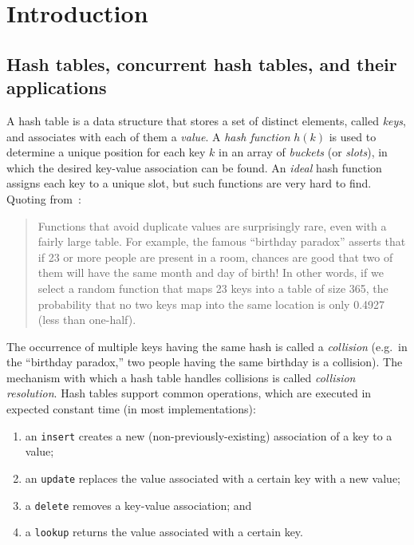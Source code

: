 \chapter{Introduction}\label{ch:introduction}


\section{Hash tables, concurrent hash tables, and their applications}\label{sec:hash-tables}

A hash table is a data structure that stores a set of distinct elements, called \emph{keys}, and associates with each of them a \emph{value}.
A \emph{{hash function}} $h(k)$ is used to determine a unique position for each key $k$ in an array of \emph{buckets} (or \emph{slots}), in which the desired key-value association can be found.
An \emph{ideal} hash function assigns each key to a unique slot, but such functions are very hard to find.
Quoting from~\cite[\S6.4]{the-art-vol-2}:
\begin{quote}
    Functions that avoid duplicate values are surprisingly rare, even with a fairly large table.
    For example, the famous ``birthday paradox'' asserts that if 23 or more people are present in a room, chances are good that two of them will have the same month and day of birth!
    In other words, if we select a random function that maps 23 keys into a table of size 365, the probability that no two keys map into the same location is only 0.4927 (less than one-half).
\end{quote}
The occurrence of multiple keys having the same hash is called a \emph{collision} (e.g.\ in the ``birthday paradox,'' two people having the same birthday is a collision).
The mechanism with which a hash table handles collisions is called \emph{{collision resolution}}.
Hash tables support common operations, which are executed in expected constant time (in most implementations):
\begin{enumerate}
    \item an \texttt{insert} creates a new (non-previously-existing) association of a key to a value;
    \item an \texttt{update} replaces the value associated with a certain key with a new value;
    \item a \texttt{delete} removes a key-value association; and
    \item a \texttt{lookup} returns the value associated with a certain key.
\end{enumerate}

